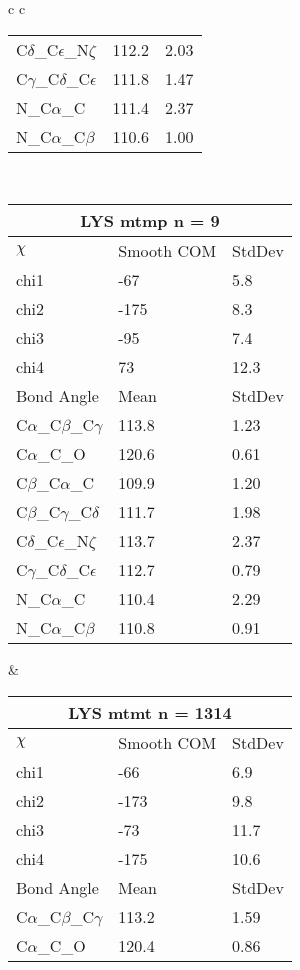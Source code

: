 \begin{longtable}{ c c }
\begin{tabular}{ l l l }
  C$\delta$\_C$\epsilon$\_N$\zeta$ & 112.2 & 2.03\\
  C$\gamma$\_C$\delta$\_C$\epsilon$ & 111.8 & 1.47\\
  N\_C$\alpha$\_C & 111.4 & 2.37\\
  N\_C$\alpha$\_C$\beta$ & 110.6 & 1.00\\
  \bottomrule
  \end{tabular}
  \\
  \begin{tabular}{ l l l }
  \toprule
  \multicolumn{3}{c}{LYS \textbf{mtmp} n = 9} \\ \toprule
  $\chi$       & Smooth COM & StdDev \\ \midrule
  chi1 & -67 & 5.8 \\ 
  chi2 & -175 & 8.3 \\ 
  chi3 & -95 & 7.4 \\ 
  chi4 & 73 & 12.3 \\ \midrule
  Bond Angle   & Mean     & StdDev \\ \midrule
  C$\alpha$\_C$\beta$\_C$\gamma$ & 113.8 & 1.23\\
  C$\alpha$\_C\_O & 120.6 & 0.61\\
  C$\beta$\_C$\alpha$\_C & 109.9 & 1.20\\
  C$\beta$\_C$\gamma$\_C$\delta$ & 111.7 & 1.98\\
  C$\delta$\_C$\epsilon$\_N$\zeta$ & 113.7 & 2.37\\
  C$\gamma$\_C$\delta$\_C$\epsilon$ & 112.7 & 0.79\\
  N\_C$\alpha$\_C & 110.4 & 2.29\\
  N\_C$\alpha$\_C$\beta$ & 110.8 & 0.91\\
  \bottomrule
  \end{tabular}
  &
  \begin{tabular}{ l l l }
  \toprule
  \multicolumn{3}{c}{LYS \textbf{mtmt} n = 1314} \\ \toprule
  $\chi$       & Smooth COM & StdDev \\ \midrule
  chi1 & -66 & 6.9 \\ 
  chi2 & -173 & 9.8 \\ 
  chi3 & -73 & 11.7 \\ 
  chi4 & -175 & 10.6 \\ \midrule
  Bond Angle   & Mean     & StdDev \\ \midrule
  C$\alpha$\_C$\beta$\_C$\gamma$ & 113.2 & 1.59\\
  C$\alpha$\_C\_O & 120.4 & 0.86\\

\end{tabular}
\end{longtable}
